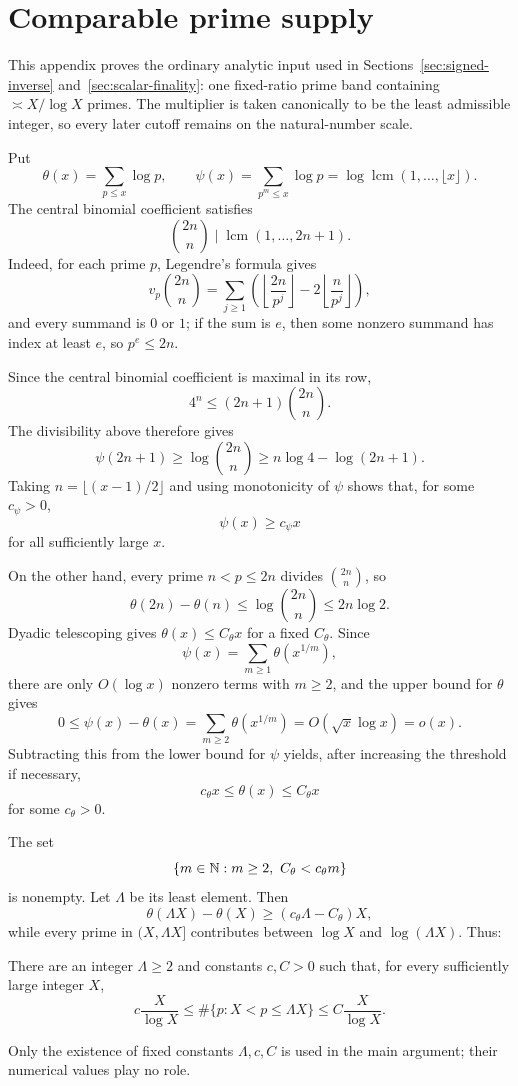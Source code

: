 \section{Comparable prime supply}
\label{app:prime-supply}

This appendix proves the ordinary analytic input used in Sections~\ref{sec:signed-inverse} and~\ref{sec:scalar-finality}: one fixed-ratio prime band containing $\asymp X/\log X$ primes.  The multiplier is taken canonically to be the least admissible integer, so every later cutoff remains on the natural-number scale.

Put
\[
\theta(x)=\sum_{p\le x}\log p,
\qquad
\psi(x)=\sum_{p^m\le x}\log p
=\log\operatorname{lcm}(1,\ldots,\lfloor x\rfloor).
\]
The central binomial coefficient satisfies
\[
\binom{2n}{n}\mid\operatorname{lcm}(1,\ldots,2n+1).
\]
Indeed, for each prime $p$, Legendre's formula gives
\[
v_p\binom{2n}{n}
=\sum_{j\ge1}
\left(\left\lfloor\frac{2n}{p^j}\right\rfloor
-2\left\lfloor\frac n{p^j}\right\rfloor\right),
\]
and every summand is $0$ or $1$; if the sum is $e$, then some nonzero summand has index at least $e$, so $p^e\le2n$.

Since the central binomial coefficient is maximal in its row,
\[
4^n\le(2n+1)\binom{2n}{n}.
\]
The divisibility above therefore gives
\[
\psi(2n+1)
\ge\log\binom{2n}{n}
\ge n\log4-\log(2n+1).
\]
Taking $n=\lfloor(x-1)/2\rfloor$ and using monotonicity of $\psi$ shows that, for some $c_\psi>0$,
\[
\psi(x)\ge c_\psi x
\]
for all sufficiently large $x$.

On the other hand, every prime $n<p\le2n$ divides $\binom{2n}{n}$, so
\[
\theta(2n)-\theta(n)
\le\log\binom{2n}{n}
\le2n\log2.
\]
Dyadic telescoping gives $\theta(x)\le C_\theta x$ for a fixed $C_\theta$.  Since
\[
\psi(x)=\sum_{m\ge1}\theta(x^{1/m}),
\]
there are only $O(\log x)$ nonzero terms with $m\ge2$, and the upper bound for $\theta$ gives
\[
0\le\psi(x)-\theta(x)
=\sum_{m\ge2}\theta(x^{1/m})
=O(\sqrt x\log x)
=o(x).
\]
Subtracting this from the lower bound for $\psi$ yields, after increasing the threshold if necessary,
\begin{equation}\label{eq:chebyshev-linear}
c_\theta x\le\theta(x)\le C_\theta x
\end{equation}
for some $c_\theta>0$.

The set
\[
\{m\in\N:m\ge2,\ C_\theta<c_\theta m\}
\]
is nonempty.  Let $\Lambda$ be its least element.  Then
\[
\theta(\Lambda X)-\theta(X)
\ge(c_\theta\Lambda-C_\theta)X,
\]
while every prime in $(X,\Lambda X]$ contributes between $\log X$ and $\log(\Lambda X)$.  Thus:

\begin{proposition}\label{prop:prime-band}
There are an integer $\Lambda\ge2$ and constants $c,C>0$ such that, for every sufficiently large integer $X$,
\[
c\frac X{\log X}
\le
\#\{p:X<p\le\Lambda X\}
\le
C\frac X{\log X}.
\]
\end{proposition}

Only the existence of fixed constants $\Lambda,c,C$ is used in the main argument; their numerical values play no role.
